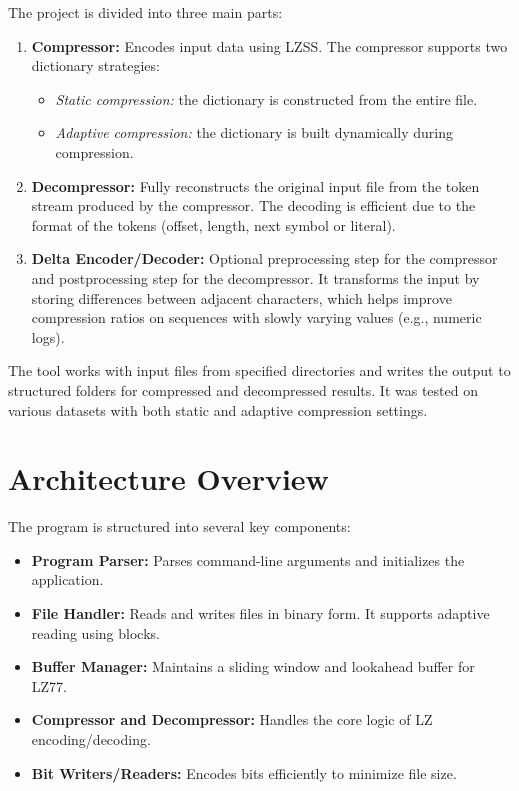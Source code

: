 \documentclass[a4paper,12pt]{article}
\begin{document}
    The project is divided into three main parts:
    \begin{enumerate}
        \item \textbf{Compressor:} Encodes input data using LZSS. The compressor supports two dictionary strategies:
        \begin{itemize}
            \item \emph{Static compression:} the dictionary is constructed from the entire file.
            \item \emph{Adaptive compression:} the dictionary is built dynamically during compression.
        \end{itemize}
        \item \textbf{Decompressor:} Fully reconstructs the original input file from the token stream produced by the compressor. The decoding is efficient due to the format of the tokens (offset, length, next symbol or literal).
        \item \textbf{Delta Encoder/Decoder:} Optional preprocessing step for the compressor and postprocessing step for the decompressor. It transforms the input by storing differences between adjacent characters, which helps improve compression ratios on sequences with slowly varying values (e.g., numeric logs).
    \end{enumerate}

    The tool works with input files from specified directories and writes the output to structured folders for compressed and decompressed results. It was tested on various datasets with both static and adaptive compression settings.




    \section{Architecture Overview}
    The program is structured into several key components:
    \begin{itemize}
        \item \textbf{Program Parser:} Parses command-line arguments and initializes the application.
        \item \textbf{File Handler:} Reads and writes files in binary form. It supports adaptive reading using blocks.
        \item \textbf{Buffer Manager:} Maintains a sliding window and lookahead buffer for LZ77.
        \item \textbf{Compressor and Decompressor:} Handles the core logic of LZ encoding/decoding.
        \item \textbf{Bit Writers/Readers:} Encodes bits efficiently to minimize file size.
    \end{itemize}
\end{document}
